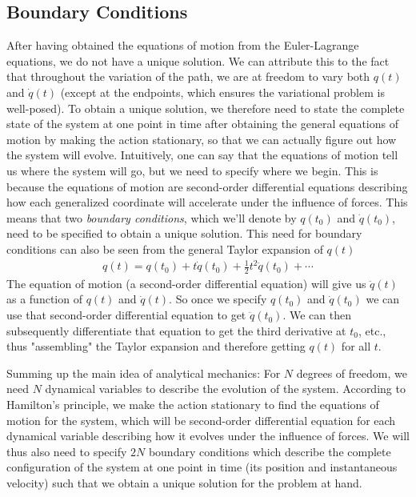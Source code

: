 \documentclass[a4paper]{article}
\begin{document}
    \subsection{Boundary Conditions}
    After having obtained the equations of motion from the Euler-Lagrange equations, we do not have a unique solution. We can attribute this to the fact that throughout the variation of the path, we are at freedom to vary both \(q(t)\) and \(\dot{q} (t)\) (except at the endpoints, which ensures the variational problem is well-posed). To obtain a unique solution, we therefore need to state the complete state of the system at one point in time after obtaining the general equations of motion by making the action stationary, so that we can actually figure out how the system will evolve. Intuitively, one can say that the equations of motion tell us where the system will go, but we need to specify where we begin. This is because the equations of motion are second-order differential equations describing how each generalized coordinate will accelerate under the influence of forces. This means that two \textit{boundary conditions}, which we'll denote by \(q(t_0)\) and \(\dot{q}(t_0)\), need to be specified to obtain a unique solution. This need for boundary conditions can also be seen from the general Taylor expansion of \(q(t)\) \begin{align*}
        q(t) = q(t_0) + t\dot{q}(t_0) + \frac{1}{2} t^{2} \ddot{q}(t_0) + \cdots 
    \end{align*} 
    The equation of motion (a second-order differential equation) will give us \(\ddot{q}(t)\) as a function of \(q(t)\) and \(\dot{q}(t)\). So once we specify \(q(t_0)\) and \(\dot{q} (t_0)\) we can use that second-order differential equation to get \(\ddot{q}(t_0)\). We can then subsequently differentiate that equation to get the third derivative at \(t_0\), etc., thus "assembling" the Taylor expansion and therefore getting \(q(t)\) for all \(t\).
    
    Summing up the main idea of analytical mechanics: For \(N\) degrees of freedom, we need \(N\) dynamical variables to describe the evolution of the system. According to Hamilton's principle, we make the action stationary to find the equations of motion for the system, which will be second-order differential equation for each dynamical variable describing how it evolves under the influence of forces. We will thus also need to specify \(2N\) boundary conditions which describe the complete configuration of the system at one point in time (its position and instantaneous velocity) such that we obtain a unique solution for the problem at hand. 
\end{document}
